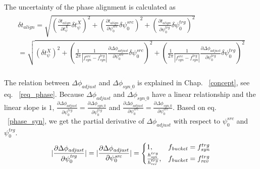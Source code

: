 \begin{itemize}
The uncertainty of the phase alignment is calculated as
\begin{eqnarray}
\begin{aligned}
\delta t_\mathit{align} =\sqrt {(\frac {\partial t_\mathit{align}}{\partial t_\psi^\mathit{X}} \delta t_\psi^\mathit{X})^2 +(\frac {\partial t_\mathit{align}}{\partial \psi^\mathit{src}_0} \delta\psi^\mathit{src}_0)^2+(\frac {\partial t_\mathit{align}}{\partial \psi^\mathit{trg}_0} \delta\psi^\mathit{trg}_0)^2  }\\
=\sqrt {(\delta t_\psi^\mathit{X})^2 +(\frac{1}{2\pi}\frac{1}{|f_{\mathit{syn}}^\mathit{src}-f_{\mathit{syn}}^\mathit{trg}|}\frac {\partial \Delta \phi_\mathit{adjust}}{\partial \psi^\mathit{src}_0}  \delta  \psi^\mathit{src}_0)^2 +(\frac{1}{2\pi}\frac{1}{|f_{\mathit{syn}}^\mathit{src}-f_{\mathit{syn}}^\mathit{trg}|}\frac {\partial \Delta \phi_\mathit{adjust}}{\partial \psi^\mathit{trg}_0}  \delta  \psi^\mathit{trg}_0)^2}\\
\label{beating_uncertainty}
\end{aligned}
\end{eqnarray}

The relation between $\Delta \phi_\mathit{adjust}$ and $\Delta \phi_\mathit{syn\_0}$ is explained in Chap. ~\ref{concept}, see eq. ~\ref{req_phase}. Because $\Delta \phi_\mathit{adjust}$ and $\Delta \phi_\mathit{syn\_0}$ have a linear relationship and the linear slope is $1$, $\frac {\partial \Delta \phi_\mathit{adjust}}{\partial \psi^\mathit{trg}_0}=\frac {\partial \Delta \phi_\mathit{syn\_0}}{\partial \psi^\mathit{trg}_0}$ and $\frac {\partial \Delta \phi_\mathit{adjust}}{\partial \psi^\mathit{src}_0}=\frac {\partial \Delta \phi_\mathit{syn\_0}}{\partial \psi^\mathit{src}_0}$. Based on eq. ~\ref{phase_syn}, we get the partial derivative of $\Delta \phi_\mathit{adjust}$ with respect to $\psi^\mathit{src}_0$ and $\psi^\mathit{trg}_0$.
\begin{eqnarray}\label{partial}
|\frac {\partial \Delta \phi_\mathit{adjust}}{\partial \psi^\mathit{trg}_0}| = |\frac {\partial \Delta \phi_\mathit{adjust}}{\partial \psi^\mathit{src}_0}|=
\begin{cases}
1, &f_{\mathit{bucket}}=f_{\mathit{syn}}^{trg}\cr
\frac{h_{\mathit{syn}}^{trg}}{h_{\mathit{rev}}^{trg}}, &f_{\mathit{bucket}}=f_{\mathit{rev}}^{trg}\cr
\end{cases}
\end{eqnarray}


\end{itemize}
